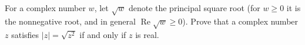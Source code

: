 For a complex number $w$, let $\sqrt w$ denote the principal square root (for $w\ge0$ it is the nonnegative root, and in general $\operatorname{Re}\sqrt w\ge0$). Prove that a complex number $z$ satisfies $|z|=\sqrt{z^2}$ if and only if $z$ is real.
